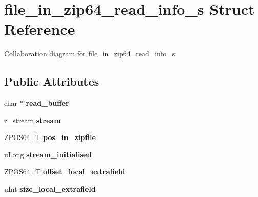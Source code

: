 \hypertarget{structfile__in__zip64__read__info__s}{\section{file\+\_\+in\+\_\+zip64\+\_\+read\+\_\+info\+\_\+s Struct Reference}
\label{structfile__in__zip64__read__info__s}
}


Collaboration diagram for file\+\_\+in\+\_\+zip64\+\_\+read\+\_\+info\+\_\+s\+:
\subsection*{Public Attributes}
\begin{DoxyCompactItemize}
\item 
\hypertarget{structfile__in__zip64__read__info__s_a6a7e147ac38ed1806be932193c8f96d1}{char $\ast$ {\bfseries read\+\_\+buffer}}\label{structfile__in__zip64__read__info__s_a6a7e147ac38ed1806be932193c8f96d1}

\item 
\hypertarget{structfile__in__zip64__read__info__s_a1826c0c38a41cfc6233e2e1e723d4cac}{\hyperlink{structz__stream__s}{z\+\_\+stream} {\bfseries stream}}\label{structfile__in__zip64__read__info__s_a1826c0c38a41cfc6233e2e1e723d4cac}

\item 
\hypertarget{structfile__in__zip64__read__info__s_a7f66f187144c9c6da0052016296c2469}{Z\+P\+O\+S64\+\_\+\+T {\bfseries pos\+\_\+in\+\_\+zipfile}}\label{structfile__in__zip64__read__info__s_a7f66f187144c9c6da0052016296c2469}

\item 
\hypertarget{structfile__in__zip64__read__info__s_ae7351ca53dec98f5776930eee062498d}{u\+Long {\bfseries stream\+\_\+initialised}}\label{structfile__in__zip64__read__info__s_ae7351ca53dec98f5776930eee062498d}

\item 
\hypertarget{structfile__in__zip64__read__info__s_a7e6c7e5e03308ba365f36f1ea6d4742d}{Z\+P\+O\+S64\+\_\+\+T {\bfseries offset\+\_\+local\+\_\+extrafield}}\label{structfile__in__zip64__read__info__s_a7e6c7e5e03308ba365f36f1ea6d4742d}

\item 
\hypertarget{structfile__in__zip64__read__info__s_aad537b7873db8b26b7ca75c5cba2b192}{u\+Int {\bfseries size\+\_\+local\+\_\+extrafield}}\label{structfile__in__zip64__read__info__s_aad537b7873db8b26b7ca75c5cba2b192}


\end{DoxyCompactItemize}
